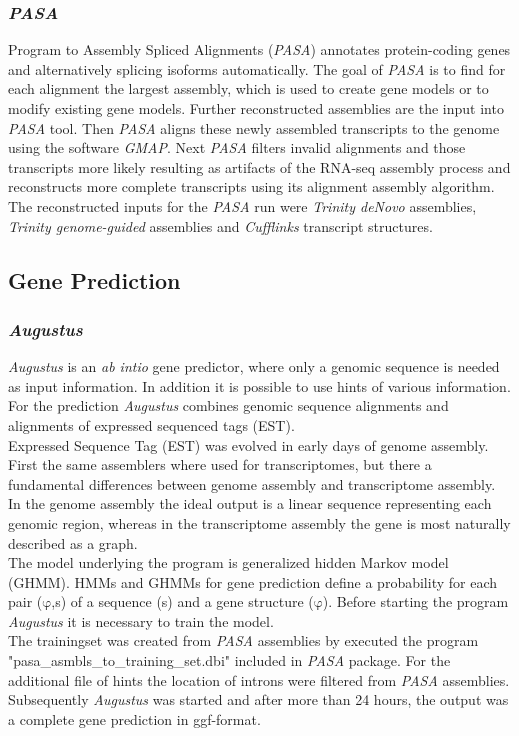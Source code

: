 \documentclass[12pt, a4paper]{report}
\begin{document}
\subsubsection*{\textit{PASA}}
Program to Assembly Spliced Alignments (\textit{PASA}) annotates protein-coding genes and alternatively splicing isoforms automatically. The goal of \textit{PASA} is to find for each alignment the largest assembly, which is used to create gene models or to modify existing gene models. \cite{Haas2003}
Further reconstructed assemblies are the input into \textit{PASA} tool. Then \textit{PASA} aligns these newly assembled transcripts to the genome using the software \textit{GMAP}. Next \textit{PASA} filters invalid alignments and those transcripts more likely resulting as artifacts of the RNA-seq assembly process and reconstructs more complete transcripts using its alignment assembly algorithm. \cite{Haas2011} \\
The reconstructed inputs for the \textit{PASA} run were \textit{Trinity deNovo} assemblies, \textit{Trinity genome-guided} assemblies and \textit{Cufflinks} transcript structures. 

\subsection*{Gene Prediction}
\subsubsection{\textit{Augustus}}
\textit{Augustus} is an \textit{ab intio} gene predictor, where only a genomic sequence is needed as input information. In addition it is possible to use hints of various information. For the prediction \textit{Augustus} combines genomic sequence alignments and alignments of expressed sequenced tags (EST).\\
Expressed Sequence Tag (EST) was evolved in early days of genome assembly. First the same assemblers where used for transcriptomes, but there a fundamental differences between genome assembly and transcriptome assembly. In the genome assembly the ideal output is a linear sequence representing each genomic region, whereas in the transcriptome assembly the gene is most naturally described as a graph. \cite{Korpelainen2014} \\
 The model underlying the program is generalized hidden Markov model (GHMM). HMMs and GHMMs for gene prediction define a probability for each pair ($\mathrm{\varphi}$,s) of a sequence (s) and a gene structure ($\mathrm{\varphi}$). Before starting the program \textit{Augustus} it is necessary to train the model. \cite{Stanke2006} \\
The trainingset was created from \textit{PASA} assemblies by executed the program "pasa\_asmbls\_to\_training\_set.dbi" included in \textit{PASA} package. For the additional file of hints the location of introns were filtered from \textit{PASA} assemblies. Subsequently \textit{Augustus} was started and after more than 24 hours, the output was a complete gene prediction in ggf-format. 
\end{document}
